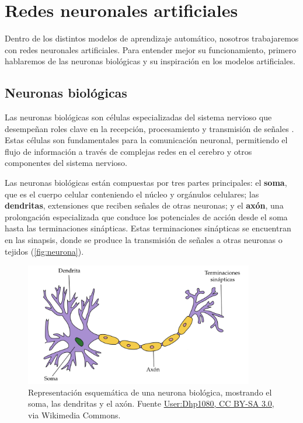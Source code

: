 
\chapter{Redes neuronales artificiales}

Dentro de los distintos modelos de aprendizaje automático, nosotros trabajaremos con redes neuronales artificiales. Para entender mejor su funcionamiento, primero hablaremos de las neuronas biológicas y su inspiración en los modelos artificiales.

\section{Neuronas biológicas}

Las neuronas biológicas son células especializadas del sistema nervioso que desempeñan roles clave en la recepción, procesamiento y transmisión de señales \cite{rosenblatt1958perceptron}. Estas células son fundamentales para la comunicación neuronal, permitiendo el flujo de información a través de complejas redes en el cerebro y otros componentes del sistema nervioso.

Las neuronas biológicas están compuestas por tres partes principales: el \textbf{soma}, que es el cuerpo celular conteniendo el núcleo y orgánulos celulares; las \textbf{dendritas}, extensiones que reciben señales de otras neuronas; y el \textbf{axón}, una prolongación especializada que conduce los potenciales de acción desde el soma hasta las terminaciones sinápticas. Estas terminaciones sinápticas se encuentran en las sinapsis, donde se produce la transmisión de señales a otras neuronas o tejidos (\autoref{fig:neurona}).

\begin{figure}[H]
	\centering
	\includegraphics[width=100mm,scale=0.5]{img/neuron.png}
	\caption{Representación esquemática de una neurona biológica, mostrando el soma, las dendritas y el axón. Fuente \href{http://creativecommons.org/licenses/by-sa/3.0/}{User:Dhp1080, CC BY-SA 3.0}, via Wikimedia Commons.}
	\label{fig:neurona}
\end{figure}

